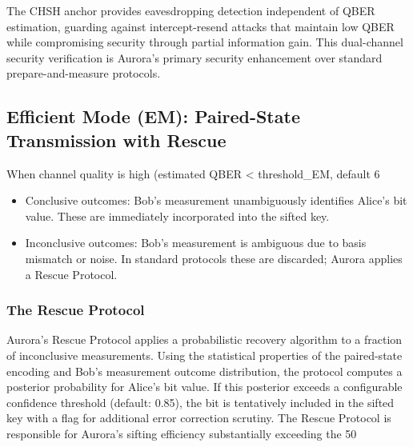 The CHSH anchor provides eavesdropping detection independent of QBER estimation, guarding against intercept-resend attacks that maintain low QBER while compromising security through partial information gain. This dual-channel security verification is Aurora's primary security enhancement over standard prepare-and-measure protocols.

\subsection{Efficient Mode (EM): Paired-State Transmission with Rescue}
When channel quality is high (estimated QBER < threshold_EM, default 6%

\begin{itemize}
\item Conclusive outcomes: Bob's measurement unambiguously identifies Alice's bit value. These are immediately incorporated into the sifted key.
\item Inconclusive outcomes: Bob's measurement is ambiguous due to basis mismatch or noise. In standard protocols these are discarded; Aurora applies a Rescue Protocol.
\end{itemize}


\subsubsection{The Rescue Protocol}
Aurora's Rescue Protocol applies a probabilistic recovery algorithm to a fraction of inconclusive measurements. Using the statistical properties of the paired-state encoding and Bob's measurement outcome distribution, the protocol computes a posterior probability for Alice's bit value. If this posterior exceeds a configurable confidence threshold (default: 0.85), the bit is tentatively included in the sifted key with a flag for additional error correction scrutiny. The Rescue Protocol is responsible for Aurora's sifting efficiency substantially exceeding the 50%

